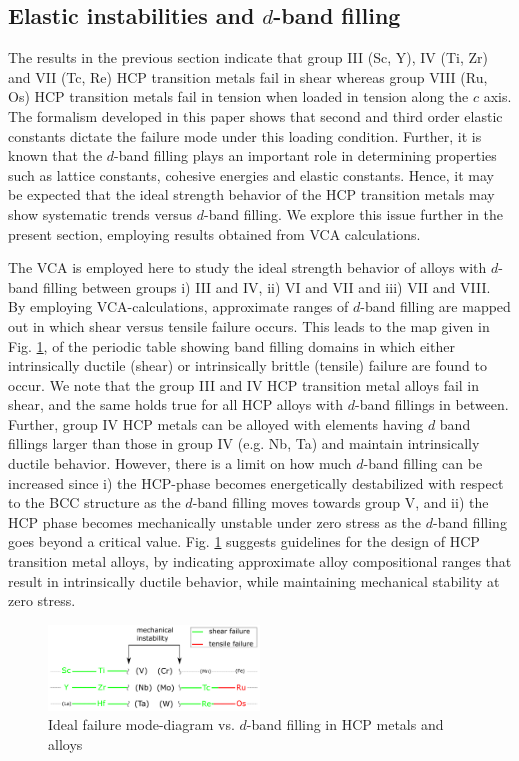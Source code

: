 \documentclass[showpacs,aps,floatfix,prb,reprint,superscriptaddress]{revtex4-1}
\begin{document}
\subsection{Elastic instabilities and $d$-band filling}
The results in the previous section indicate that group III (Sc, Y), IV (Ti, Zr) and VII (Tc, Re) HCP transition metals fail in shear whereas group VIII (Ru, Os) HCP transition metals fail in tension when loaded in tension along the $c$ axis. The formalism developed in this paper shows that second and third order elastic constants dictate the failure mode under this loading condition.  Further, it is known that the $d$-band filling plays an important role in determining properties such as lattice constants, cohesive energies and elastic constants. Hence, it may be expected that the ideal strength behavior of the HCP transition metals may show systematic trends versus $d$-band filling.  We explore this issue further in the present section, employing results obtained from VCA calculations.

The VCA is employed here to study the ideal strength behavior of alloys with $d$-band filling between groups i) III and IV, ii) VI and VII and iii) VII and VIII. By employing VCA-calculations, approximate ranges of $d$-band filling are mapped out in which shear versus tensile failure occurs. This leads to the map given in Fig. \ref{fig:sgentwinpic1}, of the periodic table showing band filling domains in which either intrinsically ductile (shear) or intrinsically brittle (tensile) failure are found to occur. We note that the group III and IV HCP transition metal alloys fail in shear, and the same holds true for all HCP alloys with $d$-band fillings in between. Further, group IV HCP metals can be alloyed with elements having $d$ band fillings larger than those in group IV (e.g. Nb, Ta) and maintain intrinsically ductile behavior. However, there is a limit on how much $d$-band filling can be increased since i) the HCP-phase becomes energetically destabilized with respect to the BCC structure as the $d$-band filling moves towards group V, and ii) the HCP phase becomes mechanically unstable under zero stress as the $d$-band filling goes beyond a critical value. Fig. \ref{fig:sgentwinpic1} suggests guidelines for the design of HCP transition metal alloys, by indicating approximate alloy compositional ranges that result in intrinsically ductile behavior, while maintaining mechanical stability at zero stress.

\begin{figure}[h!]
\centering
\includegraphics[width=0.50\textwidth]{drawing1.png}
\caption{Ideal failure mode-diagram vs. $d$-band filling in HCP metals and alloys}
\label{fig:sgentwinpic1}
\end{figure}
\end{document}
